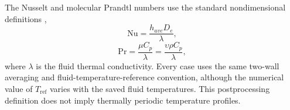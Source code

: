 The Nusselt and molecular Prandtl numbers use the standard nondimensional definitions \citep{thulukkanam2013},
\begin{equation}
\mathrm{Nu}=\frac{h_{ave}D_e}{\lambda},
\label{eq:Nu}
\end{equation}
\begin{equation}
\mathrm{Pr}=\frac{\mu C_p}{\lambda}=\frac{\upsilon\rho C_p}{\lambda},
\label{eq:Pr}
\end{equation}
where $\lambda$ is the fluid thermal conductivity. Every case uses the same two-wall averaging and fluid-temperature-reference convention, although the numerical value of $T_{\mathrm{ref}}$ varies with the saved fluid temperatures. This postprocessing definition does not imply thermally periodic temperature profiles.
